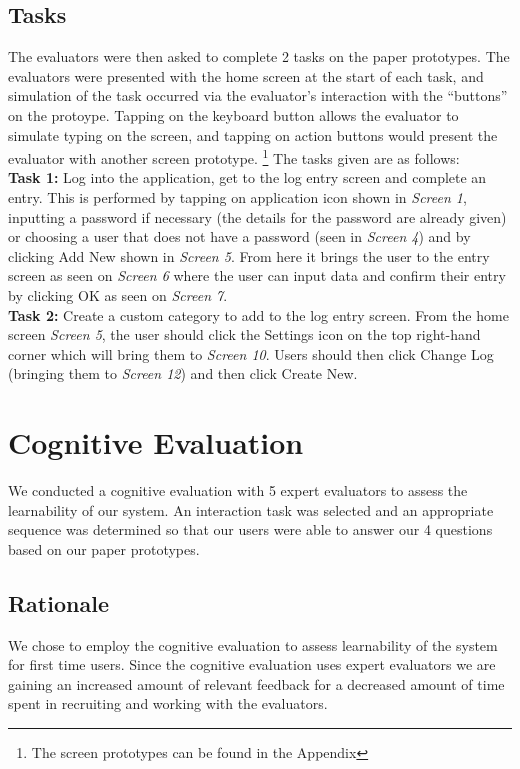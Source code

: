 \documentclass[pdftex,12pt,a4paper]{report}
\begin{document}
\section{Tasks}
The evaluators were then asked to complete 2 tasks on the paper prototypes. The evaluators were presented with the home screen at the start of each task, and simulation of the task occurred via the evaluator's interaction with the ``buttons'' on the protoype. Tapping on the keyboard button allows the evaluator to simulate typing on the screen, and tapping on action buttons would present the evaluator with another screen prototype. \footnote{The screen prototypes can be found in the Appendix} The tasks given are as follows:
\vspace{12pt}
\\\textbf{Task 1:} Log into the application, get to the log entry screen and complete an entry.
This is performed by tapping on application icon shown in \textit{Screen 1}, inputting a password
if necessary (the details for the password are already given) or choosing a user that does
not have a password (seen in \textit{Screen 4}) and by clicking Add New shown in \textit{Screen 5}. From here it brings the user to the entry screen as seen on \textit{Screen 6} where the user can input data and confirm their entry by clicking OK as seen on \textit{Screen 7}.
\vspace{12pt}
\\\textbf{Task 2:} Create a custom category to add to the log entry screen. From the home screen
\textit{Screen 5}, the user should click the Settings icon on the top right-hand corner which will
bring them to \textit{Screen 10}. Users should then click Change Log (bringing them to \textit{Screen 12}) and then click Create New.

\chapter{Cognitive Evaluation}
We conducted a cognitive evaluation with 5 expert evaluators to assess the learnability of our system. An interaction task was selected and an appropriate sequence was determined so that our users were able to answer our 4 questions based on our paper prototypes.

\section{Rationale}
We chose to employ the cognitive evaluation to assess learnability of the system for first time users. Since the cognitive evaluation uses expert evaluators we are gaining an increased amount of relevant feedback for a decreased amount of time spent in recruiting and working with the evaluators.
\end{document}
